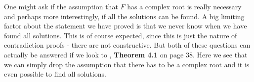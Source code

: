 \documentclass{article}
\begin{document}
One might ask if the assumption that $F$ has a complex root is really necessary and perhaps more interestingly, if all the solutions can be found. A big limiting factor about the statement we have proved is that we never know when we have found all solutions. This is of course expected, since this is just the nature of contradiction proofs - there are not constructive. But both of these questions can actually be answered if we look to \cite{baker}, \textbf{Theorem 4.1} on page 38. Here we see that we can simply drop the assumption that there has to be a complex root and it is even possible to find all solutions.


\end{document}
